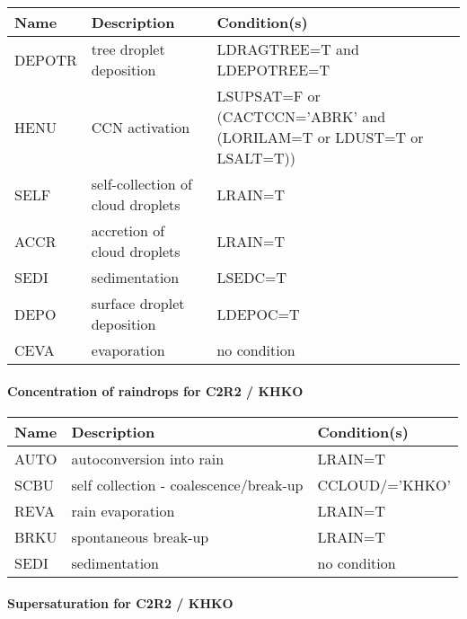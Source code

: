 \begin{longtable} {|p{}|p{}|p{}|}
\hline
Name & Description & Condition(s) \\
\hline \hline
DEPOTR & tree droplet deposition           & LDRAGTREE=T and LDEPOTREE=T \\\hline
HENU   & CCN activation                    & LSUPSAT=F or (CACTCCN='ABRK' and (LORILAM=T or LDUST=T or LSALT=T)) \\\hline
SELF   & self-collection of cloud droplets & LRAIN=T \\\hline
ACCR   & accretion of cloud droplets       & LRAIN=T \\\hline
SEDI   & sedimentation                     & LSEDC=T \\\hline
DEPO   & surface droplet deposition        & LDEPOC=T \\\hline
CEVA   & evaporation                       & no condition \\\hline
\endhead
\end{longtable}

\paragraph{Concentration of raindrops for C2R2 / KHKO}
\mbox{} %

\begin{longtable} {|p{}|p{}|p{}|}
\hline
Name & Description & Condition(s) \\
\hline \hline
AUTO   & autoconversion into rain               & LRAIN=T        \\\hline
SCBU   & self collection - coalescence/break-up & CCLOUD/='KHKO' \\\hline
REVA   & rain evaporation                       & LRAIN=T        \\\hline
BRKU   & spontaneous break-up                   & LRAIN=T        \\\hline
SEDI   & sedimentation                          & no condition   \\\hline
\endhead
\end{longtable}

\paragraph{Supersaturation for C2R2 / KHKO}
\mbox{} %

